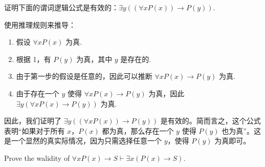 \documentclass[cn, hazy, blue, normal, 12pt]{elegantnote}
\begin{document}
\begin{exercise}

    证明下面的谓词逻辑公式是有效的：$\exists y (( \forall x P(x)) \rightarrow P(y))$.

\end{exercise}

\begin{solution}[print=true]

    使用推理规则来推导：

    \begin{enumerate}
        \item 假设 $\forall x P(x)$ 为真.
        \item 根据 1，有 $P(y)$ 为真，其中 $y$ 是存在的.
        \item 由于第一步的假设是任意的，因此可以推断 $\forall x P(x) \rightarrow P(y)$ 为真.
        \item 由于存在一个 $y$ 使得 $\forall x P(x) \rightarrow P(y)$ 为真，因此 $\exists y (\forall x P(x) \rightarrow P(y))$ 为真.
    \end{enumerate}

    因此，我们证明了 $\exists y (( \forall x P(x)) \rightarrow P(y))$ 是有效的。简而言之，这个公式表明“如果对于所有 $x$，$P(x)$ 都为真，那么存在一个 $y$ 使得 $P(y)$ 也为真”。这是一个显然的真实际情况，因为只需选择任意一个 $y$，使得 $P(y)$ 为真即可。

\end{solution}

\begin{exercise}

    Prove the walidity of $\forall x P(x) \rightarrow S \vdash \exists x(P(x) \rightarrow S)$.

\end{exercise}
\end{document}
